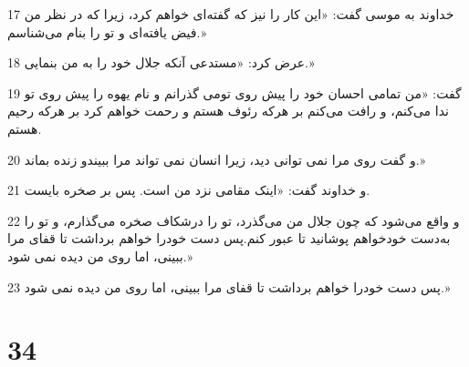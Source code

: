 \par 17 خداوند به موسی گفت: «این کار را نیز که گفته‌ای خواهم کرد، زیرا که در نظر من فیض یافته‌ای و تو را بنام می‌شناسم.»
\par 18 عرض کرد: «مستدعی آنکه جلال خود را به من بنمایی.»
\par 19 گفت: «من تمامی احسان خود را پیش روی تومی گذرانم و نام یهوه را پیش روی تو ندا می‌کنم، و رافت می‌کنم بر هر‌که رئوف هستم و رحمت خواهم کرد بر هر‌که رحیم هستم.
\par 20 و گفت روی مرا نمی توانی دید، زیرا انسان نمی تواند مرا ببیندو زنده بماند.»
\par 21 و خداوند گفت: «اینک مقامی نزد من است. پس بر صخره بایست.
\par 22 و واقع می‌شود که چون جلال من می‌گذرد، تو را درشکاف صخره می‌گذارم، و تو را به‌دست خودخواهم پوشانید تا عبور کنم.پس دست خودرا خواهم برداشت تا قفای مرا ببینی، اما روی من دیده نمی شود.»
\par 23 پس دست خودرا خواهم برداشت تا قفای مرا ببینی، اما روی من دیده نمی شود.»
 
\chapter{34}

